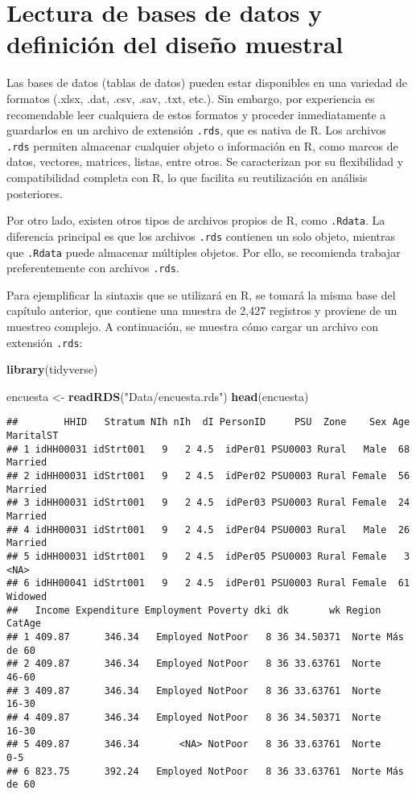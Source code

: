 \documentclass[
  12pt,
]{book}
\newenvironment{Shaded}{\begin{snugshade}}{\end{snugshade}}
\newcommand{\FunctionTok}[1]{\textcolor[rgb]{0.13,0.29,0.53}{\textbf{#1}}}
\newcommand{\NormalTok}[1]{#1}
\newcommand{\OtherTok}[1]{\textcolor[rgb]{0.56,0.35,0.01}{#1}}
\newcommand{\StringTok}[1]{\textcolor[rgb]{0.31,0.60,0.02}{#1}}
\begin{document}
\section{Lectura de bases de datos y definición del diseño muestral}\label{lectura-de-bases-de-datos-y-definiciuxf3n-del-diseuxf1o-muestral}

Las bases de datos (tablas de datos) pueden estar disponibles en una variedad de formatos (.xlsx, .dat, .csv, .sav, .txt, etc.). Sin embargo, por experiencia es recomendable leer cualquiera de estos formatos y proceder inmediatamente a guardarlos en un archivo de extensión \texttt{.rds}, que es nativa de R. Los archivos \texttt{.rds} permiten almacenar cualquier objeto o información en R, como marcos de datos, vectores, matrices, listas, entre otros. Se caracterizan por su flexibilidad y compatibilidad completa con R, lo que facilita su reutilización en análisis posteriores.

Por otro lado, existen otros tipos de archivos propios de R, como \texttt{.Rdata}. La diferencia principal es que los archivos \texttt{.rds} contienen un solo objeto, mientras que \texttt{.Rdata} puede almacenar múltiples objetos. Por ello, se recomienda trabajar preferentemente con archivos \texttt{.rds}.

Para ejemplificar la sintaxis que se utilizará en R, se tomará la misma base del capítulo anterior, que contiene una muestra de 2,427 registros y proviene de un muestreo complejo. A continuación, se muestra cómo cargar un archivo con extensión \texttt{.rds}:

\begin{Shaded}
\begin{Highlighting}[]
\FunctionTok{library}\NormalTok{(tidyverse)}

\NormalTok{encuesta }\OtherTok{\textless{}{-}} \FunctionTok{readRDS}\NormalTok{(}\StringTok{"Data/encuesta.rds"}\NormalTok{)}
\FunctionTok{head}\NormalTok{(encuesta)}
\end{Highlighting}
\end{Shaded}

\begin{verbatim}
##        HHID   Stratum NIh nIh  dI PersonID     PSU  Zone    Sex Age MaritalST
## 1 idHH00031 idStrt001   9   2 4.5  idPer01 PSU0003 Rural   Male  68   Married
## 2 idHH00031 idStrt001   9   2 4.5  idPer02 PSU0003 Rural Female  56   Married
## 3 idHH00031 idStrt001   9   2 4.5  idPer03 PSU0003 Rural Female  24   Married
## 4 idHH00031 idStrt001   9   2 4.5  idPer04 PSU0003 Rural   Male  26   Married
## 5 idHH00031 idStrt001   9   2 4.5  idPer05 PSU0003 Rural Female   3      <NA>
## 6 idHH00041 idStrt001   9   2 4.5  idPer01 PSU0003 Rural Female  61   Widowed
##   Income Expenditure Employment Poverty dki dk       wk Region    CatAge
## 1 409.87      346.34   Employed NotPoor   8 36 34.50371  Norte Más de 60
## 2 409.87      346.34   Employed NotPoor   8 36 33.63761  Norte     46-60
## 3 409.87      346.34   Employed NotPoor   8 36 33.63761  Norte     16-30
## 4 409.87      346.34   Employed NotPoor   8 36 34.50371  Norte     16-30
## 5 409.87      346.34       <NA> NotPoor   8 36 33.63761  Norte       0-5
## 6 823.75      392.24   Employed NotPoor   8 36 33.63761  Norte Más de 60
\end{verbatim}
\end{document}
